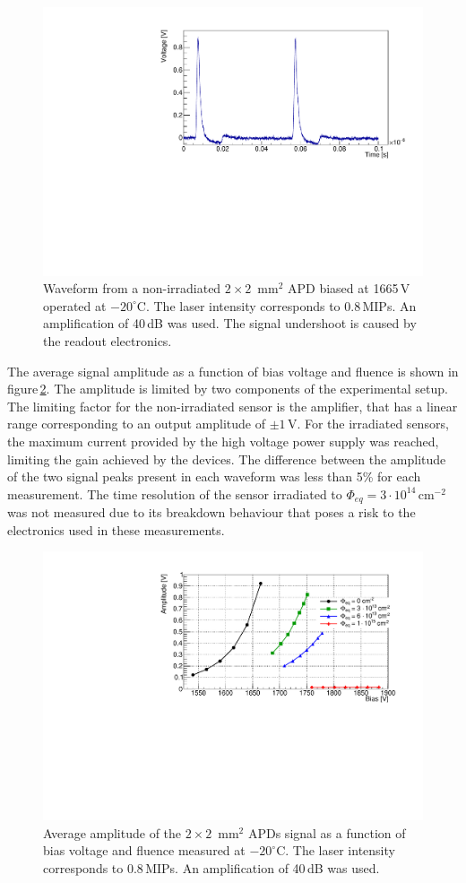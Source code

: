 \documentclass[review,number,sort&compress]{elsarticle}
\begin{document}
\begin{figure}
  \centering
  \includegraphics[width = 0.6 \columnwidth]{APD_394-1-51_1665V_evt1100_2pulses}
  \caption{Waveform from a non-irradiated $2 \times 2$~mm$^2$ APD biased at 1665\,V operated at $-20^\circ$C. The laser intensity corresponds to 0.8\,MIPs. An amplification of 40\,dB was used. The signal undershoot is caused by the readout electronics.}
  \label{fig:pulses2x2timing}
\end{figure}

The average signal amplitude as a function of bias voltage and fluence is shown in figure\,\ref{fig:ampli2x2}.
The amplitude is limited by two components of the experimental setup.
The limiting factor for the non-irradiated sensor is the amplifier, that has a linear range corresponding to an output amplitude of $\pm 1$\,V.
For the irradiated sensors, the maximum current provided by the high voltage power supply was reached, limiting the gain achieved by the devices.
The difference between the amplitude of the two signal peaks present in each waveform was less than 5\% for each measurement.
The time resolution of the sensor irradiated to $\Phi_{eq} = 3 \cdot 10^{14}$\,cm$^{-2}$ was not measured due to its breakdown behaviour that poses a risk to the electronics used in these measurements.

\begin{figure}
  \centering
  \includegraphics[width = 0.6 \columnwidth]{ampli2x2APDs}
  \caption{Average amplitude of the $2 \times 2$~mm$^2$ APDs signal as a function of bias voltage and fluence measured at $-20^\circ$C. The laser intensity corresponds to 0.8\,MIPs. An amplification of 40\,dB was used.}
  \label{fig:ampli2x2}
\end{figure}
\end{document}
